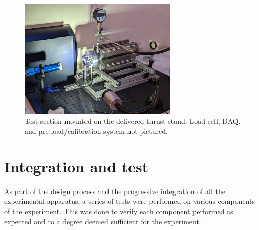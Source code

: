             \begin{figure}[h]
                \centering
                \includegraphics[trim=0 0 0 12in, clip, width=0.67\textwidth]{assets/3 design/thrust_stand.jpg}
                \caption[Test section mounted on the delivered thrust stand]{Test section mounted on the delivered thrust stand. Load cell, DAQ, and pre-load/calibration system not pictured. }
                \label{fig:thrust_stand}
            \end{figure}

    \section{Integration and test}
        As part of the design process and the progressive integration of all the experimental apparatus, a series of tests were performed on various components of the experiment. This was done to verify each component performed as expected and to a degree deemed sufficient for the experiment.
        
